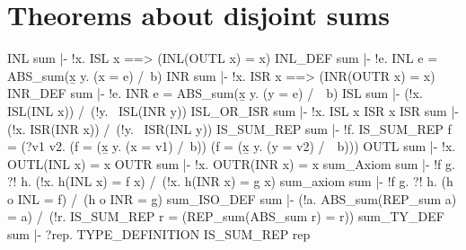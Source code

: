 \section{Theorems about disjoint sums}
\THEOREM INL sum
|- !x. ISL x ==> (INL(OUTL x) = x)
\ENDTHEOREM
\THEOREM INL\_DEF sum
|- !e. INL e = ABS_sum(\b x y. (x = e) /\ b)
\ENDTHEOREM
\THEOREM INR sum
|- !x. ISR x ==> (INR(OUTR x) = x)
\ENDTHEOREM
\THEOREM INR\_DEF sum
|- !e. INR e = ABS_sum(\b x y. (y = e) /\ ~b)
\ENDTHEOREM
\THEOREM ISL sum
|- (!x. ISL(INL x)) /\ (!y. ~ISL(INR y))
\ENDTHEOREM
\THEOREM ISL\_OR\_ISR sum
|- !x. ISL x \/ ISR x
\ENDTHEOREM
\THEOREM ISR sum
|- (!x. ISR(INR x)) /\ (!y. ~ISR(INL y))
\ENDTHEOREM
\THEOREM IS\_SUM\_REP sum
|- !f.
    IS_SUM_REP f =
    (?v1 v2.
      (f = (\b x y. (x = v1) /\ b)) \/ (f = (\b x y. (y = v2) /\ ~b)))
\ENDTHEOREM
\THEOREM OUTL sum
|- !x. OUTL(INL x) = x
\ENDTHEOREM
\THEOREM OUTR sum
|- !x. OUTR(INR x) = x
\ENDTHEOREM
\THEOREM sum\_Axiom sum
|- !f g. ?! h. (!x. h(INL x) = f x) /\ (!x. h(INR x) = g x)
\ENDTHEOREM
\THEOREM sum\_axiom sum
|- !f g. ?! h. (h o INL = f) /\ (h o INR = g)
\ENDTHEOREM
\THEOREM sum\_ISO\_DEF sum
|- (!a. ABS_sum(REP_sum a) = a) /\
   (!r. IS_SUM_REP r = (REP_sum(ABS_sum r) = r))
\ENDTHEOREM
\THEOREM sum\_TY\_DEF sum
|- ?rep. TYPE_DEFINITION IS_SUM_REP rep
\ENDTHEOREM
